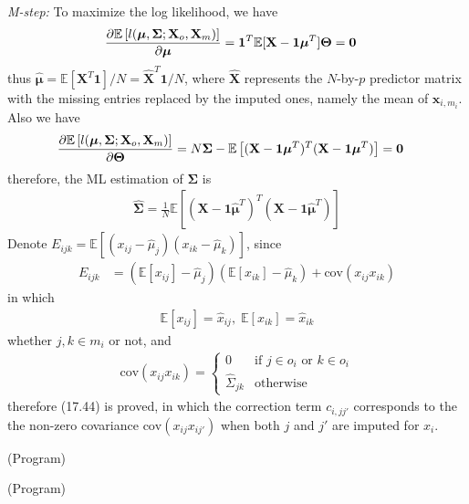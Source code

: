 \begin{exercise}
\begin{exerciseSection}
    \emph{M-step: } To maximize the log likelihood, we have
    \begin{align}
      \pdv{\mathbb{E}\left[l(\bm{\mu}, \mathbf{\Sigma}; \mathbf{X}_o,
      \mathbf{X}_m)\right]}{\bm{\mu}} &= \mathbf{1}^T\mathbb{E}[\mathbf{X} -
      \mathbf{1}\bm{\mu}^T]\mathbf{\Theta} = \mathbf{0}
    \end{align}
    thus $\hat{\bm{\mu}} = \mathbb{E}[\mathbf{X}^T\mathbf{1}] / N =
    \hat{\mathbf{X}}^T\mathbf{1} / N$, where $\hat{\mathbf{X}}$ represents the
    $N$-by-$p$ predictor matrix with the missing entries replaced by the imputed
    ones, namely the mean of $\mathbf{x}_{i, m_i}$. Also we have
    \begin{align}
      \pdv{\mathbb{E}\left[l(\bm{\mu}, \mathbf{\Sigma}; \mathbf{X}_o,
      \mathbf{X}_m)\right]}{\mathbf{\Theta}} &= N\mathbf{\Sigma} -
      \mathbb{E} \left[(\mathbf{X} - \mathbf{1}\bm{\mu}^T)^T(\mathbf{X} -
      \mathbf{1}\bm{\mu}^T) \right] = \mathbf{0}
    \end{align}
    therefore, the ML estimation of $\mathbf{\Sigma}$ is
    \begin{align}
      \hat{\mathbf{\Sigma}} = \frac{1}{N} \mathbb{E} \left[(\mathbf{X} -
      \mathbf{1}\hat{\bm{\mu}}^T)^T(\mathbf{X} - \mathbf{1}\hat{\bm{\mu}}^T)
      \right]
    \end{align}
    Denote $E_{ijk} = \mathbb{E}\left[(x_{ij} - \hat{\mu}_j)(x_{ik} -
    \hat{\mu}_k) \right]$, since
    \begin{align}
      E_{ijk} &= (\mathbb{E}[x_{ij}] - \hat{\mu}_j)(\mathbb{E}[x_{ik}] -
      \hat{\mu}_k) + \mbox{cov}(x_{ij}x_{ik})
    \end{align}
    in which 
    \begin{align}
      \mathbb{E}[x_{ij}] = \hat{x}_{ij},\;\mathbb{E}[x_{ik}] = \hat{x}_{ik}
    \end{align}
    whether $j,k\in m_i$ or not, and
    \begin{align}
      \mbox{cov}(x_{ij}x_{ik}) = \left\{
        \begin{array}{ll}
          0 & \mbox{if } j\in o_i \mbox{ or } k\in o_i \\
          \hat{\Sigma}_{jk} & \mbox{otherwise}
        \end{array}
      \right.
    \end{align}
    therefore (17.44) is proved, in which the correction term $c_{i, jj'}$
    corresponds to the the non-zero covariance $\mbox{cov}(x_{ij}x_{ij'})$ when
    both $j$ and $j'$ are imputed for $x_i$.
  \end{exerciseSection}
  
  \begin{exerciseSection}
    (Program)
  \end{exerciseSection}
  
  \begin{exerciseSection}
    (Program)
  \end{exerciseSection}
\end{exercise}

